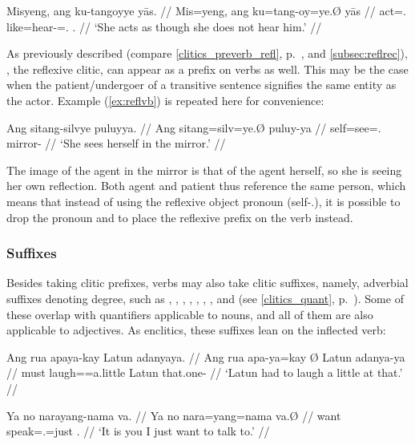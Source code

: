 \ex\begingl
	\gla Misyeng, ang ku-tangoyye yās. //
	\glb Mis=yeng, ang ku=tang-oy=ye.Ø yās //
	\glc act=\TsgF{}.\Aarg{} \AgtT{} like=hear-\Neg{}=\TsgF{}.\Top{} 
		\TsgM{}.\Parg{} //
	\glft `She acts as though she does not hear him.' //
\endgl\xe

As previously described (compare \autoref{clitics_preverb_refl},
p.~\pageref{clitics_preverb_refl}, and \ref{subsec:reflrec}),
, the reflexive clitic, can appear as a prefix on
verbs as well. This may be the case when the patient/undergoer of a
transitive sentence signifies the same entity as the actor. Example
(\ref{ex:reflvb}) is repeated here for convenience:

\ex\begingl
	\gla Ang sitang-silvye puluyya. //
	\glb Ang sitang=silv=ye.Ø puluy-ya //
	\glc \AgtT{} self=see=\TsgF{}.\Top{} mirror-\Loc{} //
	\glft `She sees herself in the mirror.' //
\endgl\xe

The image of the agent in the mirror is that of the agent herself, so she is
seeing her own reflection. Both agent and patient thus reference the same
person, which means that instead of using the reflexive object pronoun
 (self-\TsgF{}.\Parg{}), it is possible
to drop the pronoun and to place the reflexive prefix on the verb instead.

\subsubsection{Suffixes}

Besides taking clitic prefixes, verbs may also take clitic suffixes, namely,
adverbial suffixes denoting degree, such as ,
, ,  , ,  ,
, and   (see
\autoref{clitics_quant}, p.~\pageref{clitics_quant}). Some of these overlap
with quantifiers applicable to nouns, and all of them are also applicable to
adjectives. As enclitics, these suffixes lean on the inflected verb:

\pex
\a\label{ex:verbquant}\begingl
	\gla Ang rua apaya-kay {} Latun adanyaya. //
	\glb Ang rua apa-ya=kay Ø Latun adanya-ya //
	\glc \AgtT{} must laugh=\TsgM{}=a.little \Top{} Latun that.one-\Loc{} //
	\glft `Latun had to laugh a little at that.' //
\endgl

\a\begingl
	\gla Ya no narayang-nama va. //
	\glb Ya no nara=yang=nama va.Ø //
	\glc \LocT{} want speak=\Fsg{}.\Aarg{}=just \Ssg{}.\Top{} //
	\glft `It is you I just want to talk to.' //
\endgl
\xe

